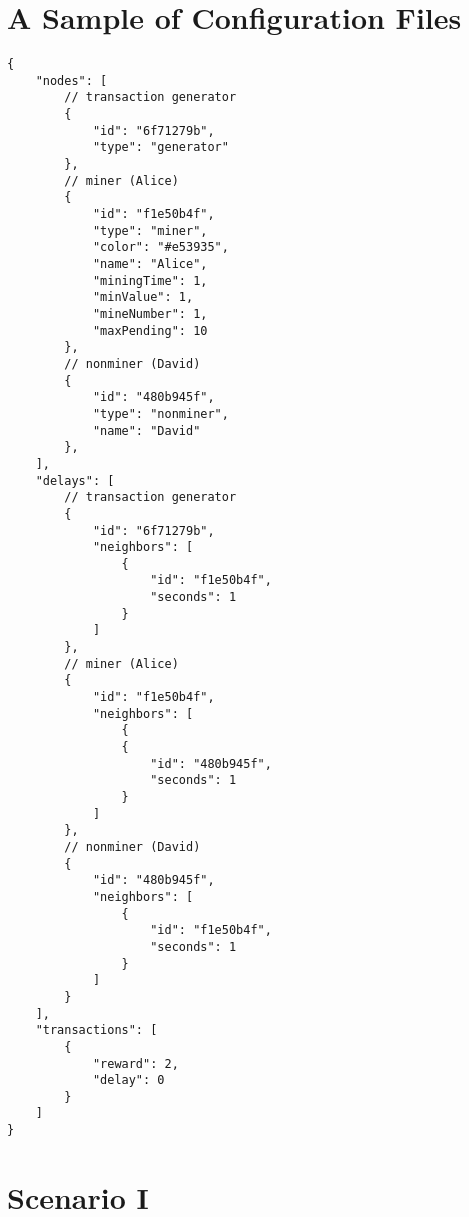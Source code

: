 \section{A Sample of Configuration Files}

\begin{lstlisting}[caption={Sample of Configuration File}, label={lst:sample of configuration file}]
{
    "nodes": [
        // transaction generator
        {
            "id": "6f71279b",
            "type": "generator"
        },
        // miner (Alice)
        {
            "id": "f1e50b4f",
            "type": "miner",
            "color": "#e53935",
            "name": "Alice",
            "miningTime": 1,
            "minValue": 1,
            "mineNumber": 1,
            "maxPending": 10
        },
        // nonminer (David)
        {
            "id": "480b945f",
            "type": "nonminer",
            "name": "David"
        },
    ],
    "delays": [
        // transaction generator
        {
            "id": "6f71279b",
            "neighbors": [
                {
                    "id": "f1e50b4f",
                    "seconds": 1
                }
            ]
        },
        // miner (Alice)
        {
            "id": "f1e50b4f",
            "neighbors": [
                {
                {
                    "id": "480b945f",
                    "seconds": 1
                }
            ]
        },
        // nonminer (David)
        {
            "id": "480b945f",
            "neighbors": [
                {
                    "id": "f1e50b4f",
                    "seconds": 1
                }
            ]
        }
    ],
    "transactions": [
        {
            "reward": 2,
            "delay": 0
        }
    ]
}
\end{lstlisting}

\section{Scenario I}


